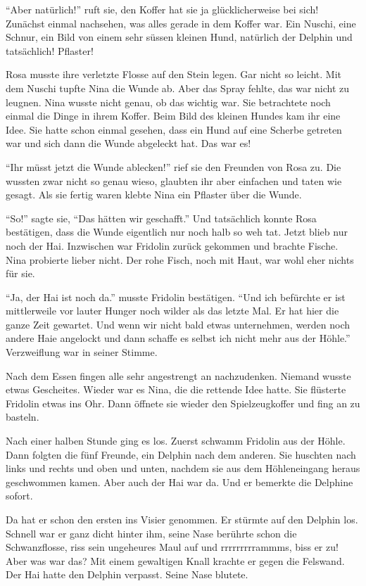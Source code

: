 \enquote{Aber natürlich!} ruft sie, den Koffer hat sie ja glücklicherweise bei sich! Zunächst einmal nachsehen, was alles gerade in dem Koffer war. Ein Nuschi, eine Schnur, ein Bild von einem sehr süssen kleinen Hund, natürlich der Delphin und tatsächlich! Pflaster! 

Rosa musste ihre verletzte Flosse auf den Stein legen. Gar nicht so leicht. Mit dem Nuschi tupfte Nina die Wunde ab. Aber das Spray fehlte, das war nicht zu leugnen. Nina wusste nicht genau, ob das wichtig war. Sie betrachtete noch einmal die Dinge in ihrem Koffer. Beim Bild des kleinen Hundes kam ihr eine Idee. Sie hatte schon einmal gesehen, dass ein Hund auf eine Scherbe getreten war und sich dann die Wunde abgeleckt hat. Das war es!

\enquote{Ihr müsst jetzt die Wunde ablecken!} rief sie den Freunden von Rosa zu. Die wussten zwar nicht so genau wieso, glaubten ihr aber einfachen und taten wie gesagt. Als sie fertig waren klebte Nina ein Pflaster über die Wunde.

\enquote{So!} sagte sie, \enquote{Das hätten wir geschafft.} Und tatsächlich konnte Rosa bestätigen, dass die Wunde eigentlich nur noch halb so weh tat. Jetzt blieb nur noch der Hai. Inzwischen war Fridolin zurück gekommen und brachte Fische. Nina probierte lieber nicht. Der rohe Fisch, noch mit Haut, war wohl eher nichts für sie.

\enquote{Ja, der Hai ist noch da.} musste Fridolin bestätigen. \enquote{Und ich befürchte er ist mittlerweile vor lauter Hunger noch wilder als das letzte Mal. Er hat hier die ganze Zeit gewartet. Und wenn wir nicht bald etwas unternehmen, werden noch andere Haie angelockt und dann schaffe es selbst ich nicht mehr aus der Höhle.} Verzweiflung war in seiner Stimme.

Nach dem Essen fingen alle sehr angestrengt an nachzudenken. Niemand wusste etwas Gescheites. Wieder war es Nina, die die rettende Idee hatte. Sie flüsterte Fridolin etwas ins Ohr. Dann öffnete sie wieder den Spielzeugkoffer und fing an zu basteln. 

Nach einer halben Stunde ging es los. Zuerst schwamm Fridolin aus der Höhle. Dann folgten die fünf Freunde, ein Delphin nach dem anderen. Sie huschten nach links und rechts und oben und unten, nachdem sie aus dem Höhleneingang heraus geschwommen kamen. Aber auch der Hai war da. Und er bemerkte die Delphine sofort.

Da hat er schon den ersten ins Visier genommen. Er stürmte auf den Delphin los. Schnell war er ganz dicht hinter ihm, seine Nase berührte schon die Schwanzflosse, riss sein ungeheures Maul auf und rrrrrrrrrammms, biss er zu! Aber was war das? Mit einem gewaltigen Knall krachte er gegen die Felswand. Der Hai hatte den Delphin verpasst. Seine Nase blutete.

